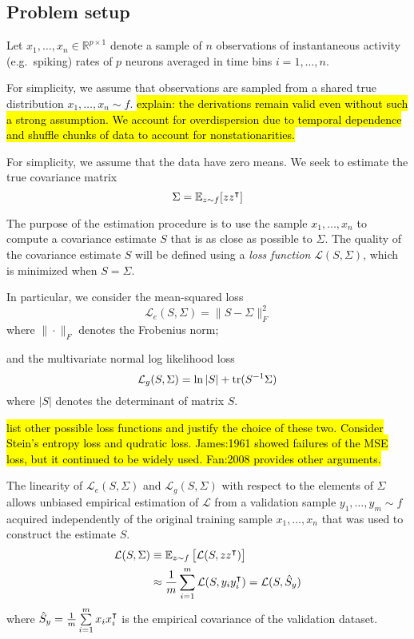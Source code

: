 \subsection*{Problem setup}
Let $x_1,\ldots,x_n \in \mathbb R^{p\times 1}$ denote a sample of $n$ observations of instantaneous activity (e.g.~spiking) rates of $p$ neurons averaged in time bins $i=1,\ldots,n$.  

For simplicity, we assume that observations are sampled from a shared true distribution $x_1,\ldots,x_n \sim f$. 
\hl{\tiny explain: the derivations remain valid even without such a strong assumption.  We account for overdispersion due to temporal dependence and shuffle chunks of data to account for nonstationarities.} 

For simplicity, we assume that the data have zero means.
We seek to estimate the true covariance matrix 
\begin{equation}
\Sigma=\mathbb E_{z\sim f}[ zz^\intercal]
\end{equation}

The purpose of the estimation procedure is to use the sample $x_1,\ldots,x_n$ to compute a covariance estimate $S$ that is as close as possible to $\Sigma$. 
The quality of the covariance estimate $S$ will be defined using a \emph{loss function} $\mathcal L\left(S, \Sigma\right)$, which is minimized when $S=\Sigma$. 

In particular, we consider the mean-squared loss
\begin{equation}
\mathcal L_e( S, \Sigma) =  \| S - \Sigma\|^2_F 
\end{equation}
where $\| \cdot \|_F$ denotes the Frobenius norm;

and the multivariate normal log likelihood loss
\begin{equation}
\mathcal L_g(S,\Sigma) = \ln |S| +  \operatorname{tr}(S^{-1} \Sigma)
\end{equation}
where $|S|$ denotes the determinant of matrix $S$.

\hl{\tiny list other possible loss functions and justify the choice of these two. Consider Stein's entropy loss and qudratic loss.   James:1961 showed failures of the MSE loss, but it continued to be widely used. Fan:2008 provides other arguments.}


The linearity of $\mathcal L_e(S,\Sigma)$ and $\mathcal L_g(S,\Sigma)$ with respect to the elements of $\Sigma$ allows unbiased empirical estimation of $\mathcal L$ from a validation sample $y_1,\ldots,y_m \sim f$ acquired independently of the original training sample $x_1,\ldots,x_n$ that was used to construct the estimate $S$.
\begin{equation}
\begin{split}
\mathcal L(S,\Sigma) & \equiv \mathbb E_{z\sim f} \left[ \mathcal L(S,zz^\intercal) \right] \\ 
&\approx \frac 1 m \sum\limits_{i=1}^m \mathcal L(S,y_i y_i^\intercal) = \mathcal L(S,\hat S_y)
\end{split}
\end{equation}
where $\hat S_y = \frac 1 m \sum\limits_{i=1}^m x_i x_i^\intercal$ is the empirical covariance of the validation dataset. 

